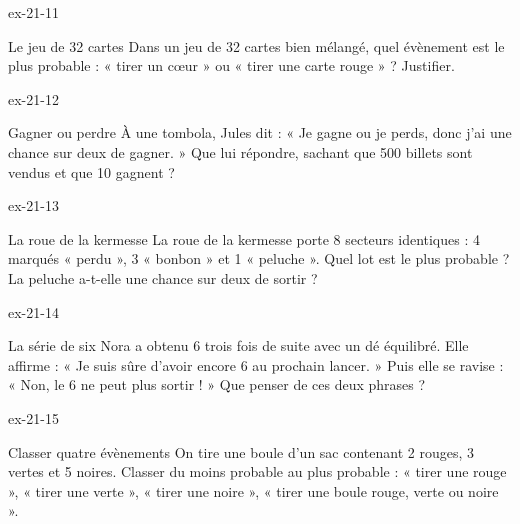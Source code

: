 \begin{blocLivre}{ex-21-11}\begin{exercice}[3]{Le jeu de 32 cartes}
Dans un jeu de 32 cartes bien mélangé, quel évènement est le plus probable : « tirer un cœur » ou « tirer une carte rouge » ? Justifier.
\end{exercice}\end{blocLivre}
\begin{blocLivre}{ex-21-12}\begin{exercice}[3]{Gagner ou perdre}
À une tombola, Jules dit : « Je gagne ou je perds, donc j’ai une chance sur deux de gagner. » Que lui répondre, sachant que 500 billets sont vendus et que 10 gagnent ?
\end{exercice}\end{blocLivre}
\begin{blocLivre}{ex-21-13}\begin{exercice}[3]{La roue de la kermesse}
La roue de la kermesse porte 8 secteurs identiques : 4 marqués « perdu », 3 « bonbon » et 1 « peluche ». Quel lot est le plus probable ? La peluche a-t-elle une chance sur deux de sortir ?
\label{fig-ex-21-13}
\end{exercice}\end{blocLivre}
\begin{blocLivre}{ex-21-14}\begin{exercice}[3]{La série de six}
Nora a obtenu 6 trois fois de suite avec un dé équilibré. Elle affirme : « Je suis sûre d’avoir encore 6 au prochain lancer. » Puis elle se ravise : « Non, le 6 ne peut plus sortir ! » Que penser de ces deux phrases ?
\end{exercice}\end{blocLivre}
\begin{blocLivre}{ex-21-15}\begin{exercice}[3]{Classer quatre évènements}
On tire une boule d’un sac contenant 2 rouges, 3 vertes et 5 noires. Classer du moins probable au plus probable : « tirer une rouge », « tirer une verte », « tirer une noire », « tirer une boule rouge, verte ou noire ».
\label{fig-ex-21-15}
\end{exercice}\end{blocLivre}

\clearpage
